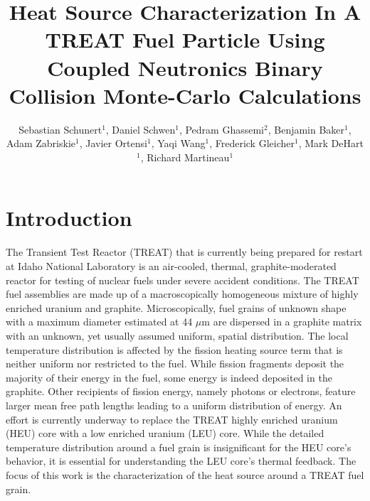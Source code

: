 \documentclass{anstrans}
\title{Heat Source Characterization In A TREAT Fuel Particle Using Coupled Neutronics Binary Collision Monte-Carlo Calculations}
\author{Sebastian Schunert$^1$, Daniel Schwen$^1$, Pedram Ghassemi$^2$, Benjamin Baker$^1$, Adam Zabriskie$^1$, Javier Ortensi$^1$, Yaqi Wang$^1$, Frederick Gleicher$^1$, Mark DeHart$^1$, Richard Martineau$^1$}
\institute{$^1$Idaho National Laboratory, Nuclear Science \&Technology Directorate, Idaho Falls, ID\\
               $^2$Department of Nuclear Engineering, North Carolina State University, Raleigh, NC}
\begin{document}
\begin{strip}
\vspace*{14pt}
\end{strip}

\section{Introduction}
The Transient Test Reactor (TREAT) that is currently being prepared for restart at Idaho National Laboratory \cite{treat} is an air-cooled, thermal, graphite-moderated reactor for testing of nuclear fuels under severe accident conditions. The TREAT fuel assemblies are made up of a macroscopically homogeneous mixture of highly enriched uranium and graphite. Microscopically, fuel grains of unknown shape with a maximum diameter estimated at 44 $\mu$m \cite{Mo2015} are dispersed in a graphite matrix with an unknown, yet usually assumed uniform, spatial distribution. The local temperature distribution is affected by the fission heating source term that is neither uniform nor restricted to the fuel. While fission fragments deposit the majority of their energy in the fuel, some energy is indeed deposited in the graphite. Other recipients of fission energy, namely photons or electrons, feature larger mean free path lengths leading to a uniform distribution of energy. An effort is currently underway to replace the TREAT highly enriched uranium (HEU) core with a low enriched uranium (LEU) core. While the detailed temperature distribution around a fuel grain is insignificant for the HEU core's behavior, it is essential for understanding the LEU core's thermal feedback. The focus of this work is the characterization of the heat source around a TREAT fuel grain.
\end{document}
